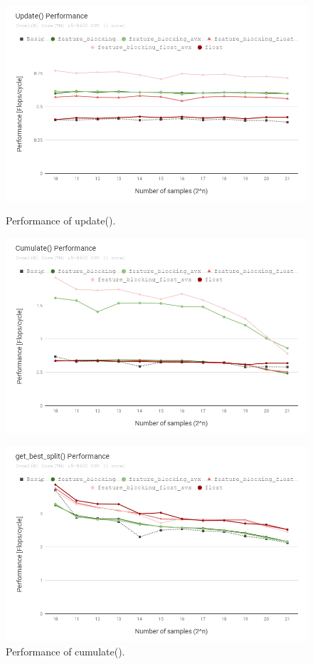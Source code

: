 
\begin{figure}[t!]
  \begin{minipage}{.45\textwidth}
      \includegraphics[width=1.0\textwidth]{fig/update.png}
      \caption{Performance of update().}
        \label{fig:update}
      \includegraphics[width=1.0\textwidth]{fig/cumulate.png}
      \caption{Performance of cumulate().}
  \end{minipage} \quad \quad
  \begin{minipage}{.45\textwidth}
      \includegraphics[width=1.0\textwidth]{fig/gbs.png}

\end{minipage}
\end{figure}

